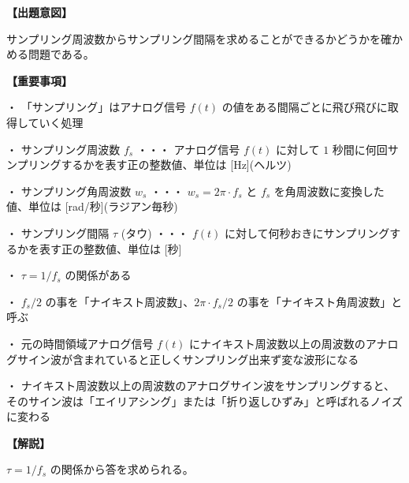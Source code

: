\noindent \textbf{【出題意図】}

\noindent サンプリング周波数からサンプリング間隔を求めることができるかどうかを確かめる問題である。

\vspace{1em}
\noindent \textbf{【重要事項】}

\medskip
\noindent ・ 「サンプリング」はアナログ信号 $f(t)$ の値をある間隔ごとに飛び飛びに取得していく処理

\medskip
\noindent ・ サンプリング周波数 $f_s$ ・・・ アナログ信号 $f(t)$ に対して $1$ 秒間に何回サンプリングするかを表す正の整数値、単位は [Hz](ヘルツ)

\medskip
\noindent ・ サンプリング角周波数 $w_s$ ・・・ $w_s = 2\pi\cdot f_s$ と $f_s$ を角周波数に変換した値、単位は [rad/秒](ラジアン毎秒)

\medskip
\noindent ・ サンプリング間隔 $\tau$ (タウ) ・・・ $f(t)$ に対して何秒おきにサンプリングするかを表す正の整数値、単位は [秒]

\medskip
\noindent ・ $\tau = 1/f_s$ の関係がある

\medskip
\noindent ・ $f_s/2$ の事を「ナイキスト周波数」、$2\pi \cdot f_s/2$ の事を「ナイキスト角周波数」と呼ぶ

\medskip
\noindent ・ 元の時間領域アナログ信号 $f(t)$ にナイキスト周波数以上の周波数のアナログサイン波が含まれていると正しくサンプリング出来ず変な波形になる

\medskip
\noindent ・ ナイキスト周波数以上の周波数のアナログサイン波をサンプリングすると、そのサイン波は「エイリアシング」または「折り返しひずみ」と呼ばれるノイズに変わる

\vspace{1em}
\noindent \textbf{【解説】}

\noindent $\tau = 1/f_s$ の関係から答を求められる。
